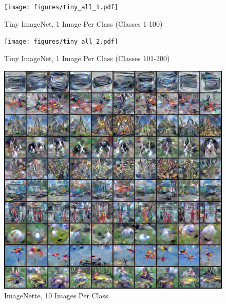 \documentclass[main.tex]{subfiles}
\begin{document}
\begin{figure}
    \centering
    \texttt{[image: figures/tiny\_all\_1.pdf]}
    \caption{Tiny ImageNet, 1 Image Per Class (Classes 1-100)}
    \label{fig:tiny1}
\end{figure}

\begin{figure}
    \centering
    \texttt{[image: figures/tiny\_all\_2.pdf]}
    \caption{Tiny ImageNet, 1 Image Per Class (Classes 101-200)}
    \label{fig:tiny2}
\end{figure}

\begin{figure}
    \centering
    \includegraphics[width=\linewidth]{figures/imagenet_10/imagenette_all.pdf}
    \caption{ImageNette, 10 Images Per Class}
    \label{fig:nette_10}
\end{figure}
\end{document}
